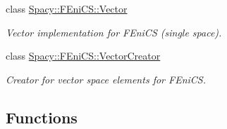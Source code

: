 \begin{DoxyCompactItemize}
class \hyperlink{classSpacy_1_1FEniCS_1_1Vector}{Spacy\+::\+F\+Eni\+C\+S\+::\+Vector}
\begin{DoxyCompactList}\small\item\em Vector implementation for F\+Eni\+C\+S (single space). \end{DoxyCompactList}\item 
class \hyperlink{classSpacy_1_1FEniCS_1_1VectorCreator}{Spacy\+::\+F\+Eni\+C\+S\+::\+Vector\+Creator}
\begin{DoxyCompactList}\small\item\em Creator for vector space elements for F\+Eni\+C\+S. \end{DoxyCompactList}\end{DoxyCompactItemize}
\subsection*{Functions}
